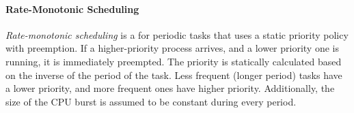\paragraph{Rate-Monotonic Scheduling}\label{par:Rate_Monotonic_Scheduling}
\begin{definition}\label{def:Rate_Monotonic_Scheduling}
  \emph{Rate-monotonic scheduling} is a  for periodic tasks that uses a static priority policy with preemption.
  If a higher-priority process arrives, and a lower priority one is running, it is immediately preempted.
  The priority is statically calculated based on the inverse of the period of the task.
  Less frequent (longer period) tasks have a lower priority, and more frequent ones have higher priority.
  Additionally, the size of the CPU burst is assumed to be constant during every period.
\end{definition}

